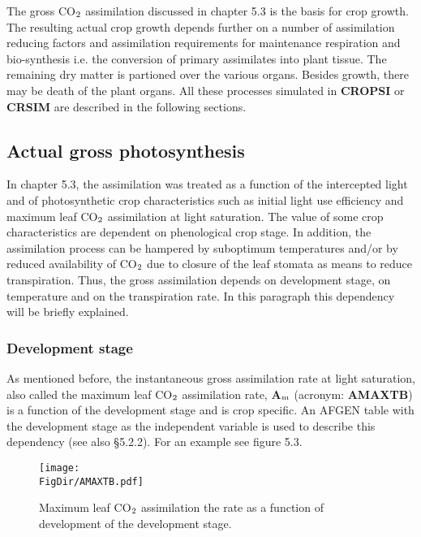The gross CO$_{{\rm 2}}$ assimilation discussed in chapter 5.3 is the basis for crop growth. The
resulting actual crop growth depends further on a number of assimilation reducing factors
and assimilation requirements for maintenance respiration and bio-synthesis i.e. the
conversion of primary assimilates into plant tissue. The remaining dry matter is partioned
over the various organs. Besides growth, there may be death of the plant organs. All
these processes simulated in {\bf CROPSI} or {\bf CRSIM} are described in the following sections.

\subsection{Actual gross photosynthesis}

In chapter 5.3, the assimilation was treated as a function of the intercepted light and of
photosynthetic crop characteristics such as initial light use efficiency and maximum leaf
CO$_{{\rm 2}}$ assimilation at light saturation. The value of some crop characteristics are dependent
on phenological crop stage. In addition, the assimilation process can be hampered by
suboptimum temperatures and/or by reduced availability of CO$_{{\rm 2}}$ due to closure of the leaf
stomata as means to reduce transpiration. Thus, the gross assimila\-tion depends on
development stage, on temperature and on the transpiration rate. In this para\-graph this
dependency will be briefly explained.

\subsubsection{Development stage}
As mentioned before, the instantaneous gross assimilation rate at light saturation, also
called the maximum leaf CO$_{{\rm 2}}$ assimilation rate, {\bf A$_{{\rm m}}$} (acronym: {\bf AMAXTB}) is a function of
the development stage and is crop specific. An AFGEN table with the development stage
as the independent variable is used to describe this dependency (see also \S 5.2.2). For an
example see figure 5.3.

\begin{figure}[p]
\centering
\texttt{[image: \\FigDir/AMAXTB.pdf]}
\caption{Maximum leaf CO$_{{\rm 2}}$ assimilation the rate as a function of develop\-ment of
the development stage.}
\end{figure}

